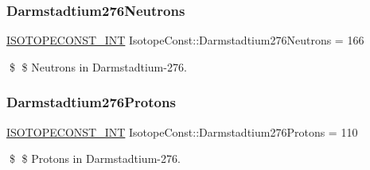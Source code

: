 \subsubsection{\texorpdfstring{Darmstadtium276\+Neutrons}{Darmstadtium276Neutrons}}
{\footnotesize\ttfamily \mbox{\hyperlink{group___isotope_const-_macros_ga5f18360b3e99483a35c32d789e62621c}{I\+S\+O\+T\+O\+P\+E\+C\+O\+N\+S\+T\+\_\+\+I\+NT}} Isotope\+Const\+::\+Darmstadtium276\+Neutrons = 166}

\$ \$ Neutrons in Darmstadtium-\/276. \mbox{\label{group___isotope_const-_darmstadtium-_ds276_ga3259292937b0d3148627ae8c265e4048}} 
\subsubsection{\texorpdfstring{Darmstadtium276\+Protons}{Darmstadtium276Protons}}
{\footnotesize\ttfamily \mbox{\hyperlink{group___isotope_const-_macros_ga5f18360b3e99483a35c32d789e62621c}{I\+S\+O\+T\+O\+P\+E\+C\+O\+N\+S\+T\+\_\+\+I\+NT}} Isotope\+Const\+::\+Darmstadtium276\+Protons = 110}

\$ \$ Protons in Darmstadtium-\/276. 